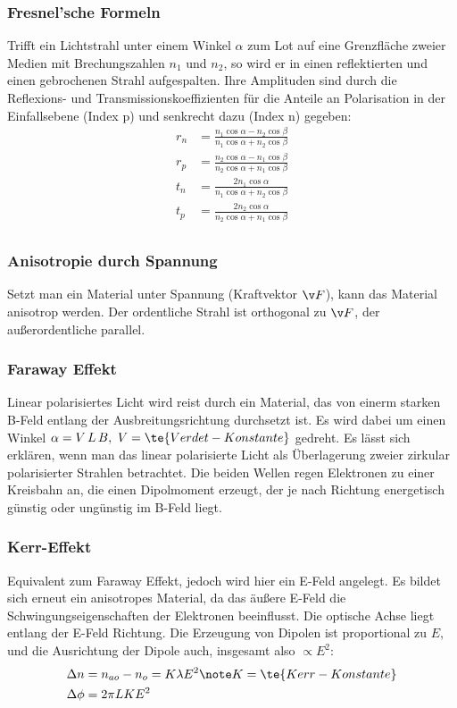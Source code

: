 \documentclass[twocolumn, unnumberedsubsub]{summery_3.1}
\begin{document}
\subsubsection{Fresnel'sche Formeln}
Trifft ein Lichtstrahl unter einem Winkel \(\alpha\) zum Lot auf eine Grenzfläche 
zweier Medien mit Brechungszahlen $n_1$ und $n_2$, so wird er in
einen reflektierten und einen gebrochenen Strahl aufgespalten. Ihre
Amplituden sind durch die Reflexions- und Transmissionskoeffizienten 
für die Anteile an Polarisation in der Einfallsebene (Index p) und
senkrecht dazu (Index n) gegeben:
\begin{align*}
    r_n &= \frac{n_1\cos\alpha - n_2\cos\beta}{n_1\cos\alpha + n_2\cos\beta}\\
    r_p &= \frac{n_2\cos\alpha - n_1\cos\beta}{n_2\cos\alpha + n_1\cos\beta}\\
    t_n &= \frac{2 n_1 \cos\alpha}{n_1\cos\alpha + n_2\cos\beta}\\
    t_p &= \frac{2 n_2 \cos\alpha}{n_2\cos\alpha + n_1\cos\beta}\\
\end{align*}

\subsubsection{Anisotropie durch Spannung}
Setzt man ein Material unter Spannung (Kraftvektor \(\v F\)), kann das Material 
anisotrop werden. Der ordentliche Strahl ist orthogonal zu \(\v F\), der
außerordentliche parallel.

\subsubsection{Faraway Effekt}
Linear polarisiertes Licht wird reist durch ein Material, das von einerm starken 
B-Feld entlang der Ausbreitungsrichtung durchsetzt ist. Es wird dabei 
um einen Winkel \(\alpha = V\, L \, B, \ V=\te{Verdet-Konstante}\) gedreht. Es lässt sich erklären, wenn man das linear polarisierte Licht als 
Überlagerung zweier zirkular polarisierter Strahlen betrachtet. 
Die beiden Wellen regen Elektronen zu einer Kreisbahn an, die einen Dipolmoment erzeugt,
der je nach Richtung energetisch günstig oder ungünstig im B-Feld liegt.

\subsubsection{Kerr-Effekt}
Equivalent zum Faraway Effekt, jedoch wird hier ein E-Feld angelegt. Es bildet sich erneut
ein anisotropes Material, da das äußere E-Feld die Schwingungseigenschaften der Elektronen 
beeinflusst. Die optische Achse liegt entlang der E-Feld Richtung.
Die Erzeugung von Dipolen ist proportional zu \(E\), und die Ausrichtung der 
Dipole auch, insgesamt also \(\propto E^2\):
\begin{align*}
    \Delta n &= n_{ao} - n_o = K \lambda E^2\note K=\te{Kerr-Konstante}\\
    \Delta \phi &= 2\pi L K E^2
\end{align*}
\end{document}
